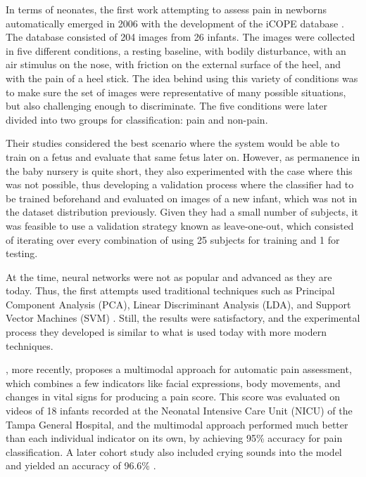 In terms of neonates, the first work attempting to assess pain in newborns automatically emerged in 2006 with the development of the iCOPE database \citep{Brahnam2006}. The database consisted of 204 images from 26 infants. The images were collected in five different conditions, a resting baseline, with bodily disturbance, with an air stimulus on the nose, with friction on the external surface of the heel, and with the pain of a heel stick. The idea behind using this variety of conditions was to make sure the set of images were representative of many possible situations, but also challenging enough to discriminate. The five conditions were later divided into two groups for classification: pain and non-pain.

Their studies considered the best scenario where the system would be able to train on a fetus and evaluate that same fetus later on. However, as permanence in the baby nursery is quite short, they also experimented with the case where this was not possible, thus developing a validation process where the classifier had to be trained beforehand and evaluated on images of a new infant, which was not in the dataset distribution previously. Given they had a small number of subjects, it was feasible to use a validation strategy known as leave-one-out, which consisted of iterating over every combination of using 25 subjects for training and 1 for testing. 

At the time, neural networks were not as popular and advanced as they are today. Thus, the first attempts used traditional techniques such as Principal Component Analysis (PCA), Linear Discriminant Analysis (LDA), and Support Vector Machines (SVM) \citep{BrahnamCSS05, Brahnam2006, BrahnamNS08}. Still, the results were satisfactory, and the experimental process they developed is similar to what is used today with more modern techniques. 

\cite{ZamzamiPGKAS16}, more recently, proposes a multimodal approach for automatic pain assessment, which combines a few indicators like facial expressions, body movements, and changes in vital signs for producing a pain score. This score was evaluated on videos of 18 infants recorded at the Neonatal Intensive Care Unit (NICU) of the Tampa General Hospital, and the multimodal approach performed much better than each individual indicator on its own, by achieving 95\% accuracy for pain classification. A later cohort study also included crying sounds into the model and yielded an accuracy of 96.6\% \citep{Zamzmi2017}.

